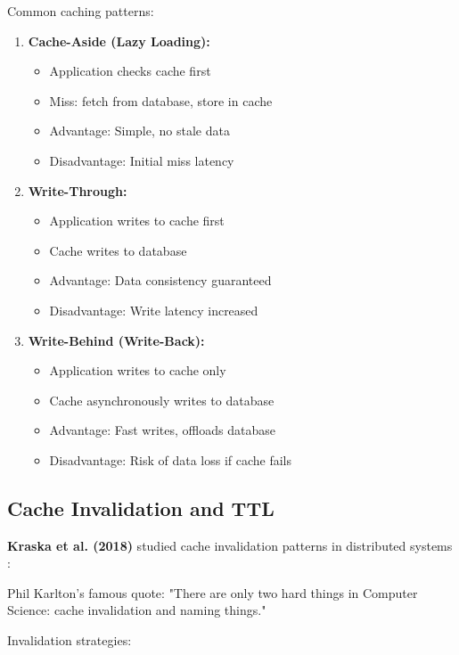 \documentclass[conference]{IEEEtran}
\begin{document}
Common caching patterns:

\begin{enumerate}
    \item \textbf{Cache-Aside (Lazy Loading):}
    \begin{itemize}
        \item Application checks cache first
        \item Miss: fetch from database, store in cache
        \item Advantage: Simple, no stale data
        \item Disadvantage: Initial miss latency
    \end{itemize}
    
    \item \textbf{Write-Through:}
    \begin{itemize}
        \item Application writes to cache first
        \item Cache writes to database
        \item Advantage: Data consistency guaranteed
        \item Disadvantage: Write latency increased
    \end{itemize}
    
    \item \textbf{Write-Behind (Write-Back):}
    \begin{itemize}
        \item Application writes to cache only
        \item Cache asynchronously writes to database
        \item Advantage: Fast writes, offloads database
        \item Disadvantage: Risk of data loss if cache fails
    \end{itemize}
\end{enumerate}

\subsection{Cache Invalidation and TTL}

\textbf{Kraska et al. (2018)} studied cache invalidation patterns in distributed systems \cite{kraska2018cache}:

Phil Karlton's famous quote: "There are only two hard things in Computer Science: cache invalidation and naming things."

Invalidation strategies:
\end{document}
